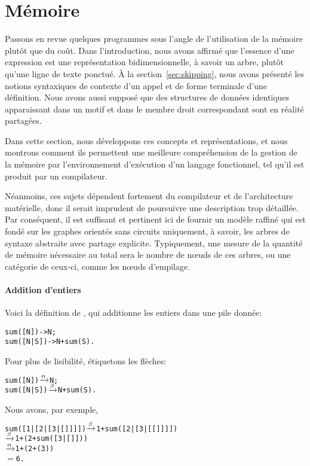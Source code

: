 \section{Mémoire}
\label{sec:memory}

Passons en revue quelques programmes sous l'angle de l'utilisation de
la mémoire plutôt que du coût. Dans l'introduction, nous avons affirmé
que l'essence d'une expression est une représentation
bidimensionnelle, à savoir un arbre, plutôt qu'une ligne de texte
ponctué. À la section~\vref{sec:skipping}, nous avons présenté les
notions syntaxiques de contexte d'un appel et de forme terminale d'une
définition. Nous avons aussi supposé que des structures de données
identiques apparaissant dans un motif et dans le membre droit
correspondant sont en réalité partagées.

Dans cette section, nous développons ces concepts et représentations,
et nous montrons comment ils permettent une meilleure compréhension de
la gestion de la mémoire par l'environnement d'exécution d'un langage
fonctionnel, tel qu'il est produit par un compilateur.

Néanmoins, ces sujets dépendent fortement du compilateur et de
l'architecture matérielle, donc il serait imprudent de poursuivre une
description trop détaillée. Par conséquent, il est suffisant et
pertinent ici de fournir un modèle raffiné qui est fondé sur les
graphes orientés sans circuits uniquement, à savoir, les arbres de
syntaxe abstraite avec partage explicite. Typiquement,
une mesure de la quantité de mémoire nécessaire au total sera le
nombre de nœuds de ces arbres, ou une catégorie de ceux-ci, comme
les nœuds d'empilage.

\paragraph{Addition d'entiers}

Voici la définition de , qui additionne les entiers
dans une pile donnée:
\begin{alltt}
sum([N])   -> N;
sum([N|S]) -> N + sum(S).
\end{alltt}
Pour plus de lisibilité, étiquetons les flèches:
\begin{alltt}
sum([N])   \(\xrightarrow{\smash[t]{\alpha}}\) N;
sum([N|S]) \(\xrightarrow{\smash[t]{\beta}}\) N + sum(S).
\end{alltt}
Nous avons, par exemple,
\begin{alltt}
sum([1|[2|[3|[]]]]) \(\xrightarrow{\smash[t]{\beta}}\) 1 + sum([2|[3|[[]]]])
                    \(\xrightarrow{\smash[t]{\beta}}\) 1 + (2 + sum([3|[]]))
                    \(\xrightarrow{\smash[t]{\alpha}}\) 1 + (2 + (3))
                    \(=\) 6.
\end{alltt}

